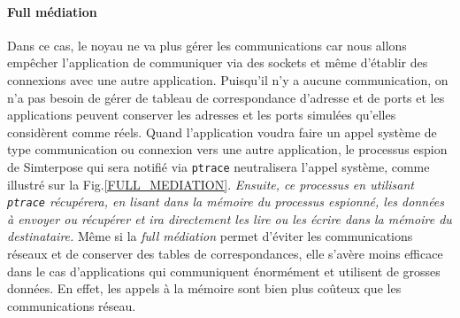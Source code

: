 \paragraph{Full médiation} 
Dans ce cas, le noyau ne va plus gérer les communications car nous allons
empêcher l'application de communiquer via des sockets et même d'établir des
connexions avec une autre application. Puisqu'il n'y a aucune communication, on
n'a pas besoin de gérer de tableau de correspondance d'adresse et de ports et
les applications peuvent conserver les adresses et les ports simulées qu'elles
considèrent comme réels. Quand l'application voudra faire un appel système de
type communication ou connexion vers une autre application, le processus espion
de Simterpose qui sera notifié via \texttt{ptrace} neutralisera l'appel système,
comme illustré sur la Fig.\ref{FULL_MEDIATION}. \textit{Ensuite, ce processus en
  utilisant \texttt{ptrace} récupérera, en lisant dans la mémoire du processus
  espionné, les données à envoyer ou récupérer et ira directement les lire ou
  les écrire dans la mémoire du destinataire.}  Même si la \textit{full
  médiation} permet d'éviter les communications réseaux et de conserver des
tables de correspondances, elle s'avère moins efficace dans le cas
d'applications qui communiquent énormément et utilisent de grosses données. En
effet, les appels à la mémoire sont bien plus coûteux que les communications
réseau.

 
